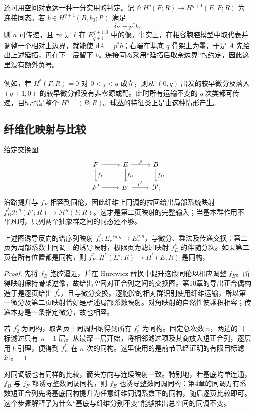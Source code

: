 还可用空间对表达一种十分实用的判定。记 \(\delta:H^q(F;R)\to H^{q+1}(E,F;R)\) 为连接同态。若 \(b\in H^{q+1}(B,b_0;R)\) 满足
\begin{equation}\label{g2:eq:transgression-relative-criterion}
	\delta a=p^*b,
\end{equation}
则 \(a\) 可传递，且 \(\tau a\) 是 \(b\) 在 \(E_{q+1}^{q+1,0}\) 中的像。事实上，在相容胞腔模型中取代表并调整一个相对上边界，就能使 \(\mathrm dA=p^*b\)；右端在基底 \(q\) 骨架上为零，于是 \(A\) 先给出上述延拓，再在下一层留下 \(b\)。连接同态采用“延拓后取余边界”的约定，因此这里没有额外负号。

\ProseParagraphBreak

例如，若 \(\widetilde H^j(F;R)=0\) 对 \(0<j<q\) 成立，则从 \((0,q)\) 出发的较早微分及落入 \((q+1,0)\) 的较早微分都没有非零源或靶。此时所有运输不变的 \(q\) 次类都可传递，目标也是整个 \(H^{q+1}(B;R)\)。球丛的特征类正是由这种情形产生。

\subsection{纤维化映射与比较}
\label{g2:subsec:1102:04}

给定交换图
\[
	\begin{tikzcd}
		F\arrow[r]\arrow[d,"f_F"]&E\arrow[r,"p"]\arrow[d,"f_E"]&B\arrow[d,"f_B"]\\
		F'\arrow[r]&E'\arrow[r,"p'"]&B',
	\end{tikzcd}
\]
沿路提升与 \(f_E\) 相容到同伦，因此纤维上同调的拉回给出局部系统映射 \(f_B^*\mathcal H^q(F';R)\to\mathcal H^q(F;R)\)。这才是第二页映射的完整输入；当基本群作用不平凡时，只列两个抽象群之间的同态还不够。

\begin{proposition}\label{g2:prop:serre-comparison}
	上述图诱导反向的谱序列映射 \(f_r^*:E_r'{}^{p,q}\to E_r^{p,q}\)，与微分、乘法及传递交换；第二页为局部系数上同调上的诱导映射，极限页为滤过映射 \(f_E^*\) 的伴随分次。如果第二页在所有位置都是同构，则 \(f_E^*:H^*(E';R)\to H^*(E;R)\) 是同构。
\end{proposition}
\begin{proof}
	先将 \(f_B\) 胞腔逼近，并在 Hurewicz 替换中提升这段同伦以相应调整 \(f_E\)。所得映射保持骨架逆像，故给出空间对正合列之间的交换图。第10章的导出正合偶构造于是逐页给出 \(f_r^*\)，且与微分交换。逐胞腔的相对群识别使用纤维运输，所以第一微分及第二页映射恰好是所述局部系数映射。对角映射的自然性使乘积相容；传递本身是一条指定微分，故也相容。

	若 \(f_2^*\) 为同构，取各页上同调归纳得到所有 \(f_r^*\) 为同构。固定总次数 \(n\)，两边的目标滤过只有 \(n+1\) 层。从最深一层开始，将相邻滤过项及其商放入短正合列，逐层用五引理，便得到 \(f_E^*\) 在 \(n\) 次的同构。这里使用的是前节已经证明的有限目标滤过。
\end{proof}

对同调版也有同样的比较，箭头方向与连续映射一致。特别地，若基底均单连通，\(f_B\) 与 \(f_F\) 都诱导整数同调同构，则 \(f_E\) 也诱导整数同调同构：第4章的同调万有系数短正合列先将基底同构提升为任意纤维同调系数下的同构，随后逐页比较即可。这个步骤解释了为什么“基底与纤维分别不变”能够推出总空间的同调不变。
